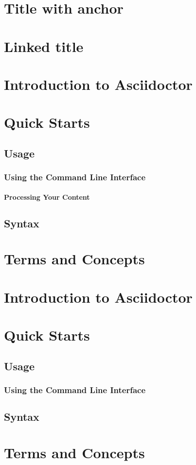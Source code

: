 \section*{Title with anchor}

\section*{Linked title}

\section{Introduction to Asciidoctor}
\section{Quick Starts}
\subsection{Usage}
\subsubsection{Using the Command Line Interface}
\paragraph{Processing Your Content}
\subsection{Syntax}
\section{Terms and Concepts}

\section{Introduction to Asciidoctor}
\section{Quick Starts}
\subsection{Usage}
\subsubsection{Using the Command Line Interface}
\subsection{Syntax}
\section{Terms and Concepts}

